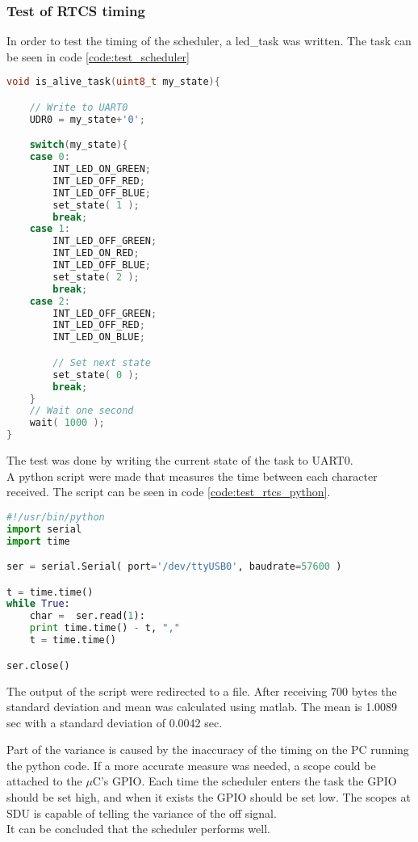 \subsubsection*{Test of RTCS timing}
In order to test the timing of the scheduler, a led\_task was written. The task can be seen in code \ref{code:test_scheduler}
\begin{lstlisting}[language = c, caption = RTCS task used in timing test, label=code:test_scheduler]
void is_alive_task(uint8_t my_state){

	// Write to UART0
	UDR0 = my_state+'0';

	switch(my_state){
	case 0:
		INT_LED_ON_GREEN;
		INT_LED_OFF_RED;
		INT_LED_OFF_BLUE;
	    set_state( 1 );
		break;
	case 1:
		INT_LED_OFF_GREEN;
		INT_LED_ON_RED;
		INT_LED_OFF_BLUE;
	    set_state( 2 );
		break;
	case 2:
		INT_LED_OFF_GREEN;
		INT_LED_OFF_RED;
		INT_LED_ON_BLUE;

		// Set next state
	    set_state( 0 );
		break;
	}
	// Wait one second
	wait( 1000 );
}
\end{lstlisting}

The test was done by writing the current state of the task to UART0.\\ A python script were made that measures the time between each character received. The script can be seen in code \ref{code:test_rtcs_python}.
\begin{lstlisting}[language = python, caption = Python code used to measure time between received byte, label=code:test_rtcs_python]
#!/usr/bin/python
import serial
import time

ser = serial.Serial( port='/dev/ttyUSB0', baudrate=57600 )

t = time.time()
while True:
    char =  ser.read(1):
    print time.time() - t, ","
    t = time.time()

ser.close()
\end{lstlisting}
The output of the script were redirected to a file. After receiving 700 bytes the standard deviation and mean was calculated using matlab.
The mean is 1.0089 sec with a standard deviation of 0.0042 sec.

Part of the variance is caused by the inaccuracy of the timing on the PC running the python code. If a more accurate measure was needed, a scope could be attached to the $\mu$C's GPIO. Each time the scheduler enters the task the GPIO should be set high, and when it exists the GPIO should be set low. The scopes at SDU is capable of telling the variance of the off signal. \\
It can be concluded that the scheduler performs well.